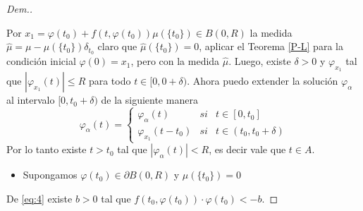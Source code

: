 \begin{proof}[Dem.]
\begin{itemize}
    \end{itemize}
Por   $x_1=\varphi(t_0)+f(t,\varphi(t_0))\mu(\{t_0\})\in B(0,R)$ la medida $\hat{\mu}=\mu-\mu(\{t_0\})\delta_{t_0}$ claro que $\hat{\mu}(\{t_0\})=0$,  aplicar el Teorema \ref{P-L} para la condición inicial $\varphi(0)=x_1$, pero con la medida $\hat{\mu}$.  Luego, existe $\delta>0$  y $\varphi_{x_1}$   tal que $|\varphi_{x_1}(t)|\leq R$ para todo $t\in [0,0+\delta)$. Ahora puedo extender la solución $\varphi_\alpha$ al intervalo $[0,t_0+\delta)$  de la siguiente manera
$$\varphi_\alpha(t)=\left\{\begin{array}{ccc}
    \varphi_\alpha(t) & si &  t\in[0,t_0]\\
     \varphi_{x_1}(t-t_0) & si &t\in(t_0,t_0+\delta) 
\end{array}\right.$$
Por lo tanto existe $t>t_0$ tal que $|\varphi_\alpha(t)|<R$, es decir vale que $t\in A$.  



 		



    
\begin{itemize}
\item Supongamos $\varphi(t_0)\in \partial B(0,R)$ y $\mu(\{t_0\})= 0$ 
\end{itemize}
De \eqref{eq:4} existe $b>0$ tal que $f(t_0,\varphi(t_0))\cdot\varphi(t_0)<-b$.


\end{proof}
